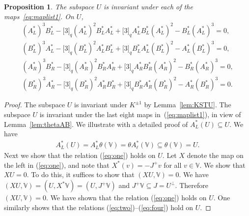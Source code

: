 \documentclass[11pt]{article}
\numberwithin{equation}{section}
\numberwithin{equation}{section}
\newtheorem{Proposition}[Theorem]{Proposition}
 { \theoremstyle{definition}
\newtheorem{Definition}[Theorem]{Definition}
\newtheorem{Example}[Theorem]{Example}
\newtheorem{Note}[Theorem]{Note}
}
\begin{document}
{\begin{Proposition}\label{prop:Uinv}The subspace $U$ is invariant under each of the maps~\eqref{eq:maplist1}. On $U$,
\begin{gather}\label{eq:one}
(A^*_L)^3 B^*_L
-\lbrack 3 \rbrack_q (A^*_L)^2 B^*_L A^*_L
+\lbrack 3 \rbrack_q A^*_L B^*_L (A^*_L)^2
-B^*_L (A^*_L)^3 = 0,
\\
\label{eq:two}
(B^*_L)^3 A^*_L -\lbrack 3 \rbrack_q (B^*_L)^2 A^*_L B^*_L
+\lbrack 3 \rbrack_q B^*_L A^*_L (B^*_L)^2
-A^*_L (B^*_L)^3 = 0,
\\
\label{eq:three}(A^*_R)^3 B^*_R
-\lbrack 3 \rbrack_q (A^*_R)^2 B^*_R A^*_R
+\lbrack 3 \rbrack_q A^*_R B^*_R (A^*_R)^2
-B^*_R (A^*_R)^3 = 0,\\
\label{eq:four}
(B^*_R)^3 A^*_R
-\lbrack 3 \rbrack_q (B^*_R)^2 A^*_R B^*_R
+\lbrack 3 \rbrack_q B^*_R A^*_R (B^*_R)^2
-A^*_R (B^*_R)^3 = 0.
\end{gather}
\end{Proposition}
\begin{proof}The subspace $U$ is invariant under $K^{\pm 1}$ by Lemma~\ref{lem:KSTU}. The subspace $U$ is invariant under the last eight maps in~(\ref{eq:maplist1}), in view of Lemma~\ref{lem:thetaAB}.
We illustrate with a detailed proof of $A^*_L (U) \subseteq U$. We have
\begin{gather*}
A^*_L (U) = A^*_L \theta (\mathbb V) = \theta A^*_\ell (\mathbb V)
\subseteq \theta (\mathbb V) = U.
\end{gather*}
Next we show that the relation (\ref{eq:one}) holds on $U$.
Let $X$ denote the map on the left in (\ref{eq:one}), and note
that $X^*(v)=-J^+v$ for all $v \in \mathbb V$. We show that
$XU=0$. To do this, it suffices to show that $(XU,\mathbb V)=0$. We have
$(XU,\mathbb V) = (U,X^*\mathbb V)=(U, J^+\mathbb V)$
and $J^+\mathbb V \subseteq J = U^\perp$. Therefore
$(XU,\mathbb V)=0$.
We have shown that the relation (\ref{eq:one}) holds on $U$.
One similarly shows that the relations (\ref{eq:two})--(\ref{eq:four}) hold on $U$.
\end{proof}

}
\end{document}
